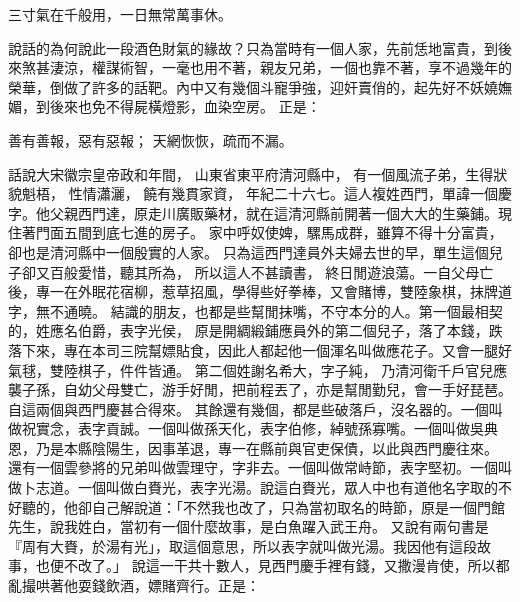 \begin{showcontents}{}
三寸氣在千般用，一日無常萬事休。

說話的為何說此一段酒色財氣的緣故？只為當時有一個人家，先前恁地富貴，到後來煞甚淒涼，權謀術智，一毫也用不著，親友兄弟，一個也靠不著，享不過幾年的榮華，倒做了許多的話靶。內中又有幾個斗寵爭強，迎奸賣俏的，起先好不妖嬈嫵媚，到後來也免不得屍橫燈影，血染空房。
正是：

善有善報，惡有惡報；
天網恢恢，疏而不漏。


話說大宋徽宗皇帝政和年間，
山東省東平府清河縣中，
有一個風流子弟，生得狀貌魁梧，
性情瀟灑，
饒有幾貫家資，
年紀二十六七。這人複姓西門，單諱一個慶字。他父親西門達，原走川廣販藥材，就在這清河縣前開著一個大大的生藥鋪。現住著門面五間到底七進的房子。
家中呼奴使婢，騾馬成群，雖算不得十分富貴，
卻也是清河縣中一個殷實的人家。
只為這西門達員外夫婦去世的早，單生這個兒子卻又百般愛惜，聽其所為，
所以這人不甚讀書，
終日閒遊浪蕩。一自父母亡後，專一在外眠花宿柳，惹草招風，學得些好拳棒，又會賭博，雙陸象棋，抹牌道字，無不通曉。
結識的朋友，也都是些幫閒抹嘴，不守本分的人。第一個最相契的，姓應名伯爵，表字光侯，
原是開綢緞鋪應員外的第二個兒子，落了本錢，跌落下來，專在本司三院幫嫖貼食，因此人都起他一個渾名叫做應花子。又會一腿好氣毬，雙陸棋子，件件皆通。
第二個姓謝名希大，字子純，
乃清河衛千戶官兒應襲子孫，自幼父母雙亡，游手好閒，把前程丟了，亦是幫閒勤兒，會一手好琵琶。自這兩個與西門慶甚合得來。
其餘還有幾個，都是些破落戶，沒名器的。一個叫做祝實念，表字貢誠。一個叫做孫天化，表字伯修，綽號孫寡嘴。一個叫做吳典恩，乃是本縣陰陽生，因事革退，專一在縣前與官吏保債，以此與西門慶往來。
還有一個雲參將的兄弟叫做雲理守，字非去。一個叫做常峙節，表字堅初。一個叫做卜志道。一個叫做白賚光，表字光湯。說這白賚光，眾人中也有道他名字取的不好聽的，他卻自己解說道：「不然我也改了，只為當初取名的時節，原是一個門館先生，說我姓白，當初有一個什麼故事，是白魚躍入武王舟。
又說有兩句書是『周有大賚，於湯有光」，取這個意思，所以表字就叫做光湯。我因他有這段故事，也便不改了。」
說這一干共十數人，見西門慶手裡有錢，又撒漫肯使，所以都亂撮哄著他耍錢飲酒，嫖賭齊行。正是：


\end{showcontents}

